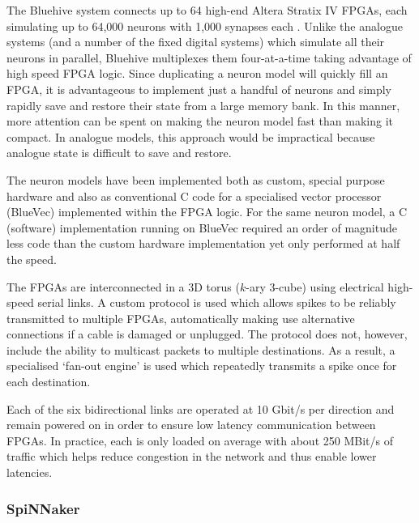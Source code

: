 				The Bluehive system connects up to 64 high-end Altera Stratix IV FPGAs,
				each simulating up to 64,000 neurons with 1,000 synapses each
				\cite{moore12}. Unlike the analogue systems (and a number of the fixed
				digital systems) which simulate all their neurons in parallel, Bluehive
				multiplexes them four-at-a-time taking advantage of high speed FPGA
				logic. Since duplicating a neuron model will quickly fill an FPGA, it is
				advantageous to implement just a handful of neurons and simply rapidly
				save and restore their state from a large memory bank. In this manner,
				more attention can be spent on making the neuron model fast than making
				it compact. In analogue models, this approach would be impractical
				because analogue state is difficult to save and restore.
				
				The neuron models have been implemented both as custom, special purpose
				hardware and also as conventional C code for a specialised vector
				processor (BlueVec) implemented within the FPGA logic. For the same
				neuron model, a C (software) implementation running on BlueVec required
				an order of magnitude less code than the custom hardware implementation
				yet only performed at half the speed.
				
				The FPGAs are interconnected in a 3D torus ($k$-ary 3-cube) using
				electrical high-speed serial links. A custom protocol is used which
				allows spikes to be reliably transmitted to multiple FPGAs,
				automatically making use alternative connections if a cable is damaged
				or unplugged. The protocol does not, however, include the ability to
				multicast packets to multiple destinations. As a result, a specialised
				`fan-out engine' is used which repeatedly transmits a spike once for
				each destination.
				
				Each of the six bidirectional links are operated at 10 Gbit/s per
				direction and remain powered on in order to ensure low latency
				communication between FPGAs. In practice, each is only loaded on average
				with about 250 MBit/s of traffic which helps reduce congestion in the
				network and thus enable lower latencies.
				
			
			\subsubsection{SpiNNaker}
				
				
